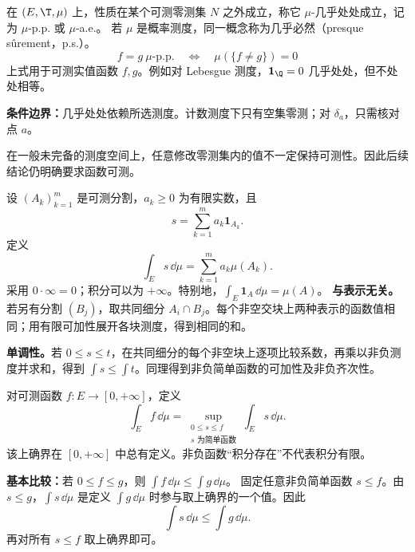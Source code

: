 在 $(E,\T,\mu)$ 上，性质在某个可测零测集 $N$ 之外成立，称它 $\mu$-几乎处处成立，记为 $\mu$-p.p. 或 $\mu$-a.e.。
若 $\mu$ 是概率测度，同一概念称为几乎必然（presque sûrement，p.s.）。
\[
f=g\ \mu\text{-p.p.}
\quad\Longleftrightarrow\quad
\mu(\{f\ne g\})=0
\]
上式用于可测实值函数 $f,g$。例如对 Lebesgue 测度，$\mathbf1_{\Q}=0$ 几乎处处，但不处处相等。

\textbf{条件边界：}几乎处处依赖所选测度。计数测度下只有空集零测；对 $\delta_a$，只需核对点 $a$。

在一般未完备的测度空间上，任意修改零测集内的值不一定保持可测性。因此后续结论仍明确要求函数可测。

设 $(A_k)_{k=1}^m$ 是可测分割，$a_k\ge0$ 为有限实数，且
\[
s=\sum_{k=1}^m a_k\mathbf1_{A_k}.
\]
定义
\[
\int_E s\,\dd\mu=\sum_{k=1}^m a_k\mu(A_k).
\]
采用 $0\cdot\infty=0$；积分可以为 $+\infty$。特别地，$\int_E\mathbf1_A\,\dd\mu=\mu(A)$。
\textbf{与表示无关。}若另有分割 $(B_j)$，取共同细分 $A_i\cap B_j$。每个非空交块上两种表示的函数值相同；用有限可加性展开各块测度，得到相同的和。

\textbf{单调性。}若 $0\le s\le t$，在共同细分的每个非空块上逐项比较系数，再乘以非负测度并求和，得到 $\int s\le\int t$。同理得到非负简单函数的可加性及非负齐次性。

对可测函数 $f:E\to[0,+\infty]$，定义
\[
\int_E f\,\dd\mu
=\sup_{\substack{0\le s\le f\\s\text{ 为简单函数}}}
\int_E s\,\dd\mu.
\]
该上确界在 $[0,+\infty]$ 中总有定义。非负函数“积分存在”不代表积分有限。

\textbf{基本比较：}若 $0\le f\le g$，则 $\int f\,\dd\mu\le\int g\,\dd\mu$。
固定任意非负简单函数 $s\le f$。由 $s\le g$，$\int s\,\dd\mu$ 是定义 $\int g\,\dd\mu$ 时参与取上确界的一个值。因此
\[
\int s\,\dd\mu\le\int g\,\dd\mu.
\]
再对所有 $s\le f$ 取上确界即可。


